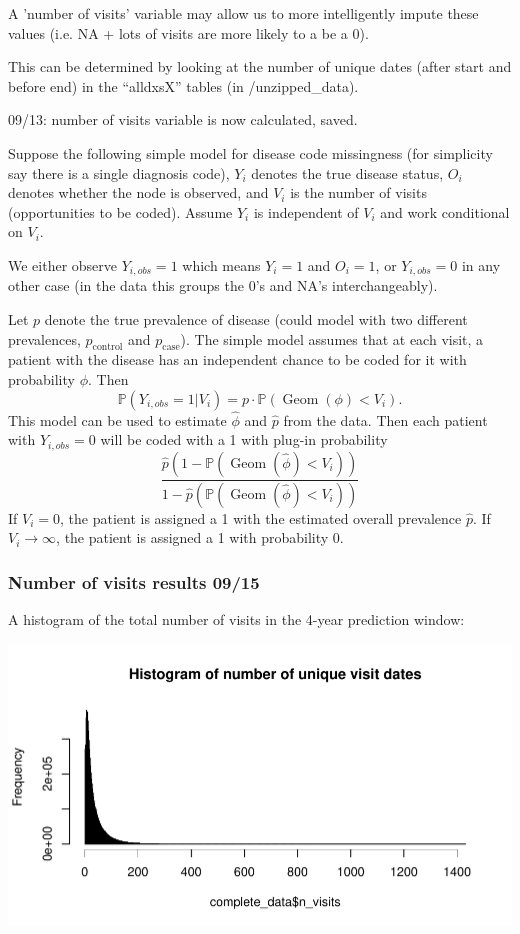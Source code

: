 \documentclass[12pt]{article}
\begin{document}
A 'number of visits' variable may allow us to more intelligently impute these values (i.e. NA + lots of visits are more likely to a be a 0).

This can be determined by looking at the number of unique dates (after start and before end) in the ``alldxsX'' tables (in /unzipped\_data).

09/13: number of visits variable is now calculated, saved.

Suppose the following simple model for disease code missingness (for simplicity say there is a single diagnosis code), $Y_i$ denotes the true disease status, $O_i$ denotes whether the node is observed, and $V_i$ is the number of visits (opportunities to be coded). Assume $Y_i$ is independent of $V_i$ and work conditional on $V_i$.

We either observe $Y_{i,obs} = 1$ which means $Y_i=1$ and $O_i=1$, or $Y_{i,obs} = 0$ in any other case (in the data this groups the 0's and NA's interchangeably).

Let $p$ denote the true prevalence of disease (could model with two different prevalences, $p_{\mathrm{control}}$ and $p_{\mathrm{case}}$). The simple model assumes that at each visit, a patient with the disease has an independent chance to be coded for it with probability $\phi$. Then
\[
\mathbb{P}(Y_{i,obs}=1 | V_i) = p \cdot \mathbb{P}(\operatorname{Geom}(\phi) < V_i).
\]
This model can be used to estimate $\hat{\phi}$ and $\hat{p}$ from the data. Then each patient with $Y_{i,obs}=0$ will be coded with a 1 with plug-in probability
\[
\frac{\hat{p}\left(1 - \mathbb{P}(\operatorname{Geom}(\hat{\phi}) < V_i) \right)}{1-\hat{p} \left(\mathbb{P}(\operatorname{Geom}(\hat{\phi}) < V_i) \right)}
\]
If $V_i=0$, the patient is assigned a 1 with the estimated overall prevalence $\hat{p}$. If $V_i \rightarrow \infty$, the patient is assigned a 1 with probability 0.

\subsubsection*{Number of visits results 09/15}

A histogram of the total number of visits in the 4-year prediction window:

\begin{center}
\includegraphics[width=.7\textwidth]{nvisits_hist.pdf}
\end{center}
\end{document}
